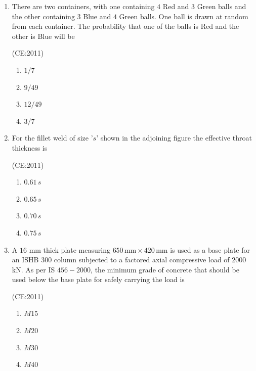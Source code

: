 \documentclass[journal,12pt,onecolumn]{IEEEtran}
\theoremstyle{remark}
\begin{document}
\begin{enumerate}
    \item
	    There are two containers, with one containing $4$ Red and $3$ Green balls and the other containing $3$ Blue and $4$ Green balls. One ball is drawn at random from each container. The probability that one of the balls is Red and the other is Blue will be

		\hfill (CE:2011)
    \begin{multicols}{4}
        \begin{enumerate}
            \item $1/7$
            \item $9/49$
            \item $12/49$
            \item $3/7$
        \end{enumerate}
    \end{multicols}

    \item
	    For the fillet weld of size '$s$' shown in the adjoining figure the effective throat thickness is
		\begin{center}
		
		\end{center}

	    \hfill (CE:2011)
    \begin{multicols}{4}
        \begin{enumerate}
            \item $0.61 \, s$
            \item $0.65 \, s$
            \item $0.70 \, s$
            \item $0.75 \, s$
        \end{enumerate}
    \end{multicols}

    \item 
	    A $16$ mm thick plate measuring $650 \, \text{mm} \times 420 \, \text{mm}$ is used as a base plate for an ISHB $300$ column subjected to a factored axial compressive load of $2000$ kN. As per IS $456-2000$, the minimum grade of concrete that should be used below the base plate for safely carrying the load is 

		\hfill (CE:2011)
    \begin{multicols}{4}
        \begin{enumerate}
            \item $M15$
            \item $M20$
            \item $M30$
            \item $M40$
        \end{enumerate}
    \end{multicols} 
    

\end{enumerate}
\end{document}
